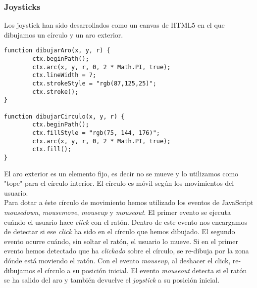 \subsubsection{Joysticks}

Los joystick han sido desarrollados como un canvas de HTML5 en el que dibujamos un círculo y un aro exterior.\\

\begin{lstlisting}[caption=Aro y círculo del joystick.]
function dibujarAro(x, y, r) {
        ctx.beginPath();
        ctx.arc(x, y, r, 0, 2 * Math.PI, true);
        ctx.lineWidth = 7;
        ctx.strokeStyle = "rgb(87,125,25)";
        ctx.stroke();
}

function dibujarCirculo(x, y, r) {
        ctx.beginPath();
        ctx.fillStyle = "rgb(75, 144, 176)";
        ctx.arc(x, y, r, 0, 2 * Math.PI, true);
        ctx.fill();
}
\end{lstlisting}


El aro exterior es un elemento fijo, es decir no se mueve y lo utilizamos como "tope" para el círculo interior. El círculo es móvil según los movimientos del usuario.\\

Para dotar a éste círculo de movimiento hemos utilizado los eventos de JavaScript \emph{mousedown}, \emph{mousemove}, \emph{mouseup} y \emph{mouseout}. El primer evento se ejecuta cuándo el usuario hace \emph{click} con el ratón. Dentro de este evento nos encargamos de detectar si ese \emph{click} ha sido en el círculo que hemos dibujado. El segundo evento ocurre cuándo, sin soltar el ratón, el usuario lo mueve. Si en el primer evento hemos detectado que ha \emph{clickado} sobre el círculo, se re-dibuja por la zona dónde está moviendo el ratón. Con el evento \emph{mouseup}, al deshacer el click, re-dibujamos el círculo a su posición inicial. El evento \emph{mouseout} detecta si el ratón se ha salido del aro y también devuelve el \emph{joystick} a su posición inicial.\\

